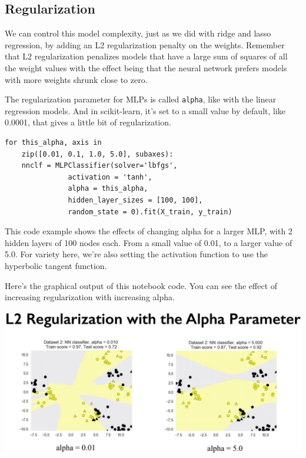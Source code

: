 \begin{multicols}{2}
\subsection{Regularization}

We can control this model complexity, just as we did with ridge and lasso regression, by adding an L2 regularization penalty on the weights. Remember that L2 regularization penalizes models that have a large sum of squares of all the weight values with the effect being that the neural network prefers models with more weights shrunk close to zero. 

The regularization parameter for MLPs is called \texttt{alpha}, like with the linear regression models. And in scikit-learn, it's set to a small value by default, like 0.0001, that gives a little bit of regularization. 

{\scriptsize
\begin{verbatim}
for this_alpha, axis in 
    zip([0.01, 0.1, 1.0, 5.0], subaxes):
    nnclf = MLPClassifier(solver='lbfgs', 
               activation = 'tanh',
               alpha = this_alpha,
               hidden_layer_sizes = [100, 100],
               random_state = 0).fit(X_train, y_train)
\end{verbatim}
}


This code example shows the effects of changing alpha for a larger MLP, with 2 hidden layers of 100 nodes each. From a small value of 0.01, to a larger value of 5.0. For variety here, we're also setting the activation function to use the hyperbolic tangent function. 

Here's the graphical output of this notebook code. You can see the effect of increasing regularization with increasing alpha. 

\begin{center}
	\includegraphics[width=\linewidth]{img/Neural-Network-L2-Regularization.png} 
\end{center}


\end{multicols}

